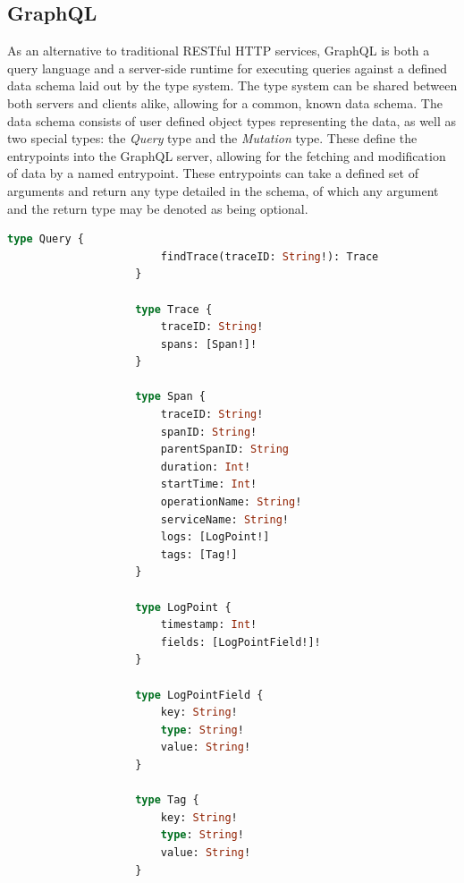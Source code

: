 \documentclass[12pt,pdftex,titlepage]{report}
\begin{document}
            \subsection{GraphQL}
                As an alternative to traditional RESTful HTTP services, GraphQL is both a query language and a server-side runtime for executing queries against a defined data schema
                laid out by the type system. The type system can be shared between both servers and clients alike, allowing for a common, known data schema. The data schema consists of 
                user defined object types representing the data, as well as two special types: the \textit{Query} type and the \textit{Mutation} type. These define the entrypoints into
                the GraphQL server, allowing for the fetching and modification of data by a named entrypoint. These entrypoints can take a defined set of arguments and return any type
                detailed in the schema, of which any argument and the return type may be denoted as being optional.

                \smallskip
                \begin{lstlisting}[caption={[GraphQL schema for a full trace object and a query to fetch a trace]The base GraphQL schema, defining a query and data types for the trace data.
                    Type annotations surrounded brackets denote a list of the type, while a type annotation followed by an exclamation mark indicates a non-optional type.}, language=GraphQL, gobble=20]
                    type Query {
                        findTrace(traceID: String!): Trace
                    }

                    type Trace {
                        traceID: String!
                        spans: [Span!]!
                    }

                    type Span {
                        traceID: String!
                        spanID: String!
                        parentSpanID: String
                        duration: Int!
                        startTime: Int!
                        operationName: String!
                        serviceName: String!
                        logs: [LogPoint!]
                        tags: [Tag!]
                    }

                    type LogPoint {
                        timestamp: Int!
                        fields: [LogPointField!]!
                    }

                    type LogPointField {
                        key: String!
                        type: String!
                        value: String!
                    }

                    type Tag {
                        key: String!
                        type: String!
                        value: String!
                    }
                \end{lstlisting}
                
\end{document}
